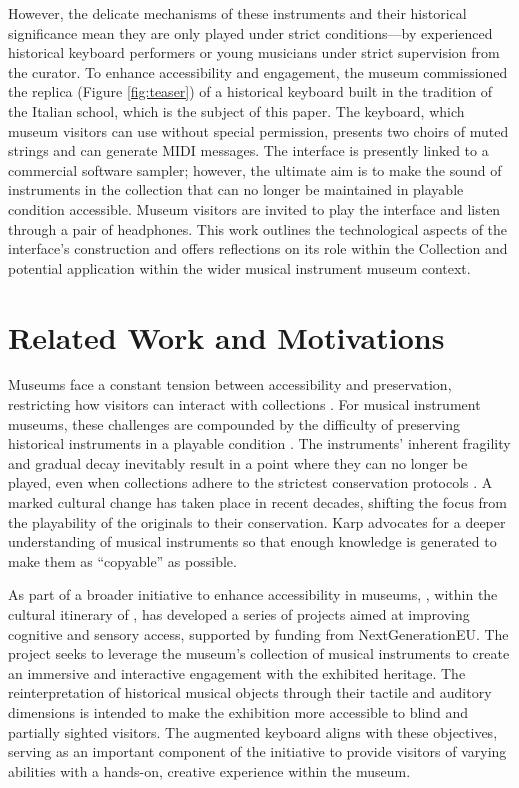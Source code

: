 However, the delicate mechanisms of these instruments and their historical significance mean they are only played under strict conditions—by experienced historical keyboard performers or young musicians under strict supervision from the curator. 
To enhance accessibility and engagement, the museum commissioned the replica (Figure \ref{fig:teaser}) of a historical keyboard built in the tradition of the Italian school, which is the subject of this paper.
The keyboard, which museum visitors can use without special permission, presents two choirs of muted strings and can generate MIDI messages. The interface is presently linked to a commercial software sampler; however, the ultimate aim is to make the sound of instruments in the collection that can no longer be maintained in playable condition accessible. Museum visitors are invited to play the interface and listen through a pair of headphones. This work outlines the technological aspects of the interface's construction and offers reflections on its role within the  Collection and potential application within the wider musical instrument museum context. 


\section{Related Work and Motivations}\label{related-work}

Museums face a constant tension between accessibility and preservation, restricting how visitors can interact with collections \cite{Templeton2018, McAlpine2014}. For musical instrument museums, these challenges are compounded by the difficulty of preserving historical instruments in a playable condition \cite{McAlpine2014}. The instruments' inherent fragility and gradual decay inevitably result in a point where they can no longer be played, even when collections adhere to the strictest conservation protocols \cite{NYT_strad}. A marked cultural change has taken place in recent decades, shifting the focus from the playability of the originals to their conservation. Karp \cite{Karp1979,Karp1985} advocates for a deeper understanding of musical instruments so that enough knowledge is generated to make them as ``copyable'' as possible.


As part of a broader initiative to enhance accessibility in museums, , within the cultural itinerary of , has developed a series of projects aimed at improving cognitive and sensory access, supported by funding from NextGenerationEU. The project seeks to leverage the museum’s collection of musical instruments to create an immersive and interactive engagement with the exhibited heritage. The reinterpretation of historical musical objects through their tactile and auditory dimensions is intended to make the exhibition more accessible to blind and partially sighted visitors. The augmented keyboard aligns with these objectives, serving as an important component of the initiative to provide visitors of varying abilities with a hands-on, creative experience within the museum.


